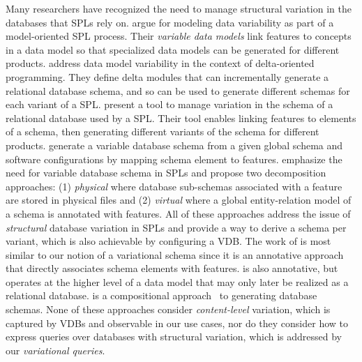Many researchers have recognized the need to manage structural variation in the
databases that SPLs rely on.
%
\citet{ad11varDataModel} argue for modeling data variability as part of a
model-oriented SPL process. Their \emph{variable data models}
link features to concepts in a data model so that specialized data models can
be generated for different products.
%
\citet{dbSchVarSPL} address data model variability in the context of
delta-oriented programming. They define delta modules that can incrementally
generate a relational database schema, and so
can be used to generate different schemas for each variant of a SPL.
%
\citet{varMngDBapp} present a tool to manage variation in the schema of a
relational database used by a SPL. Their tool enables
linking features to elements of a schema, then generating different variants of
the schema for different products.
%
\citet{slrs12CAiSE} generate a variable database schema from a given global schema and
software configurations by mapping schema element to features.
%
\citet{skrhas09DBIS} emphasize the need for variable database schema in SPLs and
propose two decomposition approaches: (1) \emph{physical} where database sub-schemas
associated with a feature are stored in physical files
and (2) \emph{virtual} where a global entity-relation model of a schema is annotated
with features.
%
All of these approaches address the issue of \emph{structural} database variation
in SPLs and provide a way to derive a schema per variant, 
which is also achievable by configuring a VDB.
%
The work of \citet{varMngDBapp} is most similar to our notion of a
variational schema since it is an annotative approach~\cite{KAK08} that
directly associates schema elements with features. \citet{ad11varDataModel}
is also annotative, but operates at the higher level of a data model that may
only later be realized as a relational database. \citet{dbSchVarSPL} is a
compositional approach~\cite{KAK08} to generating database schemas.
%
None of these approaches consider \emph{content-level} variation, which is
captured by VDBs and observable in our use cases, nor do they consider how
to express queries over databases with structural variation, which is addressed
by our \emph{variational queries}.


